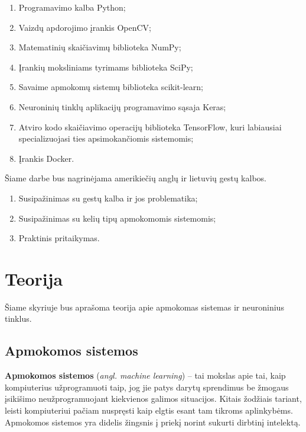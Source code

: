 \documentclass{VUMIFInfKursinis}
\begin{document}
\begin{enumerate}
	\item Programavimo kalba Python;
	\item Vaizdų apdorojimo įrankis OpenCV;
	\item Matematinių skaičiavimų biblioteka NumPy;
	\item Įrankių moksliniams tyrimams biblioteka SciPy;
	\item Savaime apmokomų sistemų biblioteka scikit-learn;
	\item Neuroninių tinklų aplikacijų programavimo sąsaja Keras;
	\item Atviro kodo skaičiavimo operacijų biblioteka TensorFlow, kuri labiausiai specializuojasi ties apsimokančiomis sistemomis;
	\item Įrankis Docker.
\end{enumerate}

Šiame darbe bus nagrinėjama amerikiečių anglų ir lietuvių gestų kalbos.
\begin{enumerate}
	\item Susipažinimas su gestų kalba ir jos problematika;
	\item Susipažinimas su kelių tipų apmokomomis sistemomis;
	\item Praktinis pritaikymas.
\end{enumerate}


\section{Teorija}
Šiame skyriuje bus aprašoma teorija apie apmokomas sistemas ir neuroninius tinklus.

\subsection{Apmokomos sistemos}

\textbf{Apmokomos sistemos} (\textit{angl. machine learning}) – tai mokslas apie tai, kaip kompiuterius užprogramuoti taip, jog jie patys darytų sprendimus be žmogaus įsikišimo neužprogramuojant kiekvienos galimos situacijos. Kitais žodžiais tariant, leisti kompiuteriui pačiam nuspręsti kaip elgtis esant tam tikroms aplinkybėms. Apmokomos sistemos yra didelis žingsnis į priekį norint sukurti dirbtinį intelektą.
\end{document}
